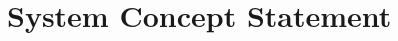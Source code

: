 \documentclass[12pt]{article} %
\begin{document}
\begin{titlepage}


\vfill %

\end{titlepage}


\tableofcontents %
\newpage %


\section{System Concept Statement} %


\end{document}
